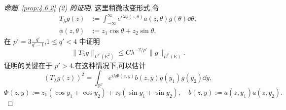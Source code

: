 \begin{proof}[命题~\ref{prop:4.6.2} (2) 的证明]
这里稍微改变形式,令
\begin{equation}
\begin{aligned}
T_{\lambda}g(z) & := \int_{-\infty}^{\infty}e^{i\lambda\phi(z, \theta)}a(z, \theta)g(\theta)\dd\theta, \\
\phi(z, \theta) & := z_{1}\cos\theta + z_{2}\sin\theta,
\end{aligned}
\end{equation}
在 $p' = 3\frac{q'}{q'-1}$,$1 \leq q' < 4$ 中证明
\begin{equation}
\|T_{\lambda}g\|_{L^{p'}(\mathbb{R}^{2})} \leq C\lambda^{-2/p'}\|g\|_{L^{q'}(\mathbb{R})}.\tag{4.6.14}
\label{eq:4.6.14}\end{equation}
证明的关键在于 $p' > 4$.在这种情况下,可以估计
\begin{equation}
(T_{\lambda}g(z))^{2} = \int_{\mathbb{R}^{2}}e^{i\lambda\Phi(z, y)}b(z, y)g(y_{1})g(y_{2})\dd y,
\end{equation}
\begin{equation*}
\Phi(z, y) := z_{1}(\cos y_{1} + \cos y_{2}) + z_{2}(\sin y_{1} + \sin y_{2}), \quad b(z, y) := a(z, y_{1})a(z, y_{2}).
\end{equation*}


\end{proof}
